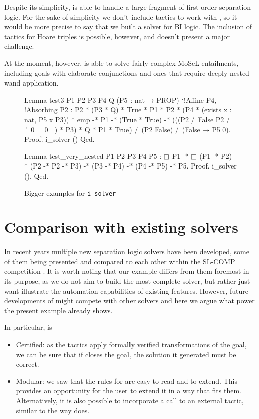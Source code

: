 Despite its simplicity,  is able to handle a large fragment of first-order separation logic.
For the sake of simplicity we don't include tactics to work with , so it would be more precise to say that we built a solver for BI logic.
The inclusion of tactics for Hoare triples is possible, however, and doesn't present a major challenge.

At the moment, however,  is able to solve fairly complex MoSeL entailments, including goals with elaborate conjunctions and ones that require deeply nested wand application.

\begin{figure}[H]
\begin{coq}
Lemma test3 P1 P2 P3 P4 Q (P5 : nat → PROP) `{!Affine P4, !Absorbing P2} :
  P2 * (P3 * Q) * True * P1 * P2 * (P4 * (exists x : nat, P5 x \/ P3)) * emp -*
    P1 -* (True * True) -*
  (((P2 /\ False \/ P2 /\ $\ulcorner$0 = 0$\urcorner$) * P3) * Q * P1 * True) /\
    (P2 \/ False) /\ (False → P5 0).
Proof. i_solver () Qed.
\end{coq}
\begin{coq}
Lemma test_very_nested P1 P2 P3 P4 P5 :
  $\mathop{\Box}$ P1 -* $\mathop{\Box}$ (P1 -* P2) -* (P2 -* P2 -* P3) -*
  (P3 -* P4) -* (P4 -* P5) -* P5.
Proof. i_solver (). Qed.
\end{coq}
\caption{Bigger examples for \texttt{i\_solver}}
\label{fig:bigger-example-i-solver}
\end{figure}

\section{Comparison with existing solvers}

In recent years multiple new separation logic solvers have been developed, some of them being presented and compared to each other within the SL-COMP competition \cite{sighireanuSLCOMPCompetitionSolvers2019}.
It is worth noting that our example differs from them foremost in its purpose, as we do not aim to build the most complete solver, but rather just want illustrate the automation capabilities of existing features.
However, future developments of \coqe{i_solver} might compete with other solvers and here we argue what power the present example already shows.

In particular,  is
\begin{itemize}
\item Certified:
  as the tactics apply formally verified transformations of the goal, we can be sure that if  closes the goal, the solution it generated must be correct.
\item Modular:
  we saw that the rules for  are easy to read and to extend.
  This provides an opportunity for the user to extend it in a way that fits them.
  Alternatively, it is also possible to incorporate a call to an external tactic, similar to the way  does.
\end{itemize}

